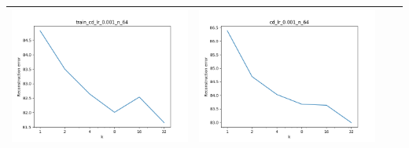 \documentclass[12pt]{report}
\begin{document}
\begin{table}[H]
\begin{tabular}{ | c | c | c | c |}
\begin{minipage}{.3\textwidth}
      \includegraphics[scale=0.25]{train_cd_lr_0_001_n_64.png}
    \end{minipage} &
    \begin{minipage}{.3\textwidth}
      \includegraphics[scale=0.25]{cd_lr_0_001_n_64.png}
    \end{minipage}
    \\ \hline
  \end{tabular}
\end{table}
\end{document}
